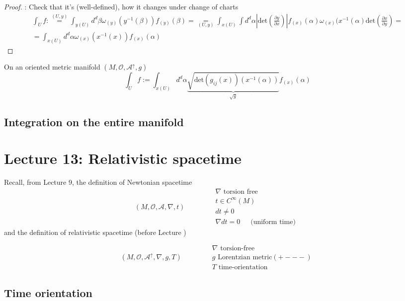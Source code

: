 \documentclass[10pt, twoside]{amsart}
\begin{document}
\begin{multicols*}{2}
\begin{proof}: Check that it's (well-defined), how it changes under change of charts
\[
\begin{gathered}
\int_U f :\overset{ (U,y) }{=} \int_{y(U)} d^d\beta \omega_{(y)}(y^{-1}(\beta)) f_{(y)}(\beta) = \underset{ (U,y)}{=} \int_{x(U)} \int d^d\alpha \left| \text{det}\left( \frac{ \partial y }{ \partial x}\right) \right| f_{(x)}(\alpha) \omega_{(x)}(x^{-1}(\alpha) \text{det}\left( \frac{ \partial x}{ \partial y } \right) = \\
= \int_{x(U)} d^d \alpha \omega_{(x)}(x^{-1}(x)) f_{(x)}(\alpha)
\end{gathered}
\]
\end{proof}

On an oriented metric manifold $(M,\mathcal{O}, \mathcal{A}^{\uparrow}, g)$
\[
\int_Uf:= \int_{x(U)} d^d\alpha  \underbrace{  \sqrt{ \text{det}(g_{ij}(x))(x^{-1}(\alpha)) } }_{\sqrt{g}}  f_{(x)}(\alpha)
\]

\subsection{Integration on the entire manifold}

\section{Lecture 13: Relativistic spacetime}

Recall, from Lecture 9, the definition of Newtonian spacetime
\[
(M, \mathcal{O}, \mathcal{A}, \nabla, t) \quad \quad \quad \, \begin{aligned}
& \nabla \text{ torsion free } \\
& t \in C^{\infty}(M) \\ 
& dt \neq 0 \\
& \nabla dt = 0   \quad \, \text{ (uniform time) }
\end{aligned}
\]
and the definition of relativistic spacetime (before Lecture )


\[
(M, \mathcal{O}, \mathcal{A}^{\uparrow}, \nabla, g, T ) \quad \quad \quad \, \begin{aligned}
& \nabla \text{ torsion-free } \\
& g \text{ Lorentzian metric} (+---) \\ 
& T \text{ time-orientation }
\end{aligned}
\]

\subsection{Time orientation}


\end{multicols*}
\end{document}
